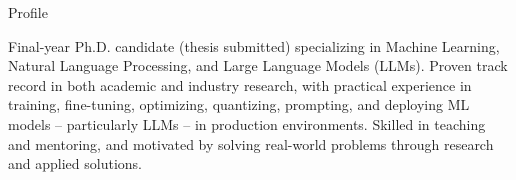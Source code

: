 


\begin{rubric}{Profile}
\begin{minipage}{\textwidth}
Final-year Ph.D. candidate (thesis submitted) specializing in Machine Learning, Natural Language Processing, and Large Language Models (LLMs). Proven track record in both academic and industry research, with practical experience in training, fine-tuning, optimizing, quantizing, prompting, and deploying ML models -- particularly LLMs -- in production environments. Skilled in teaching and mentoring, and motivated by solving real-world problems through research and applied solutions.
\end{minipage}
\end{rubric}